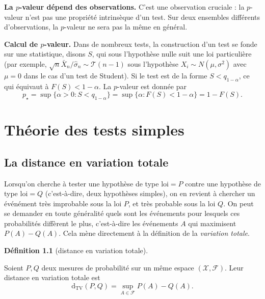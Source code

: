 \documentclass[
  10,
  letterpaper,
  DIV=11,
  numbers=noendperiod]{scrreport}
\newcommand{\dtv}{\mathrm{d}_{\mathrm{TV}}}
\theoremstyle{plain}
\theoremstyle{definition}
\theoremstyle{plain}
\theoremstyle{definition}
\newtheorem{definition}{Définition}[chapter]
\theoremstyle{definition}
\theoremstyle{plain}
\theoremstyle{remark}
\begin{document}
\textbf{La \(p\)-valeur dépend des observations.} C'est une observation
cruciale : la \(p\)-valeur n'est pas une propriété intrinsèque d'un
test. Sur deux ensembles différents d'observations, la \(p\)-valeur ne
sera pas la même en général.

\textbf{Calcul de \(p\)-valeur.} Dans de nombreux tests, la construction
d'un test se fonde sur une statistique, disons \(S\), qui sous
l'hypothèse nulle suit une loi particulière (par exemple,
\(\sqrt{n}\bar{X}_n / \hat{\sigma}_n \sim \mathscr{T}(n-1)\) sous
l'hypothèse \(X_i \sim N(\mu,\sigma^2)\) avec \(\mu=0\) dans le cas d'un
test de Student). Si le test est de la forme \(S < q_{1-\alpha}\), ce
qui équivaut à \(F(S)<1-\alpha\). La \(p\)-valeur est donnée par
\[p_\star = \sup\{\alpha > 0 : S < q_{1-\alpha}\} = \sup\{\alpha : F(S)<1-\alpha\} = 1 - F(S).\]


\hypertarget{thuxe9orie-des-tests-simples}{%
\chapter{Théorie des tests simples}\label{thuxe9orie-des-tests-simples}}

\hypertarget{la-distance-en-variation-totale}{%
\section{La distance en variation
totale}\label{la-distance-en-variation-totale}}

Lorsqu'on cherche à tester une hypothèse de type \(\text{loi} = P\)
contre une hypothèse de type \(\mathrm{loi} = Q\) (c'est-à-dire, deux
hypothèses simples), on en revient à chercher un événément très
improbable sous la loi \(P\), et très probable sous la loi \(Q\). On
peut se demander en toute généralité quels sont les événements pour
lesquels ces probabilités diffèrent le plus, c'est-à-dire les événements
\(A\) qui maximisent \(P(A) - Q(A)\). Cela mène directement à la
définition de la \emph{variation totale}.

\begin{definition}[distance en variation
totale]\protect\hypertarget{def-dtv}{}\label{def-dtv}

Soient \(P,Q\) deux mesures de probabilité sur un même espace
\((\mathcal{X}, \mathscr{F})\). Leur distance en variation totale est
\[ \dtv(P,Q) = \sup_{A \in \mathscr{F}}P(A) - Q(A). \]

\end{definition}
\end{document}
